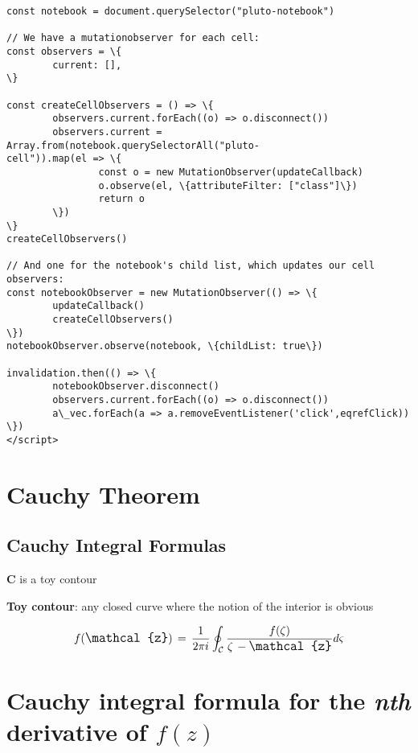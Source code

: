 \documentclass[11pt]{article}
\begin{document}
\begin{tcolorbox}[breakable, size=fbox, boxrule=.5pt, pad at break*=1mm, opacityfill=0]
\begin{Verbatim}[commandchars=\\\{\}]
const notebook = document.querySelector("pluto-notebook")

// We have a mutationobserver for each cell:
const observers = \{
        current: [],
\}

const createCellObservers = () => \{
        observers.current.forEach((o) => o.disconnect())
        observers.current = Array.from(notebook.querySelectorAll("pluto-
cell")).map(el => \{
                const o = new MutationObserver(updateCallback)
                o.observe(el, \{attributeFilter: ["class"]\})
                return o
        \})
\}
createCellObservers()

// And one for the notebook's child list, which updates our cell observers:
const notebookObserver = new MutationObserver(() => \{
        updateCallback()
        createCellObservers()
\})
notebookObserver.observe(notebook, \{childList: true\})

invalidation.then(() => \{
        notebookObserver.disconnect()
        observers.current.forEach((o) => o.disconnect())
        a\_vec.forEach(a => a.removeEventListener('click',eqrefClick))
\})
</script>

\end{Verbatim}
\end{tcolorbox}
        
    \section{Cauchy Theorem}\label{cauchy-theorem}

    \subsection{Cauchy Integral Formulas}\label{cauchy-integral-formulas}

\textbf{C} is a toy contour

\textbf{Toy contour}: any closed curve where the notion of the interior
is obvious

\[\large f(\mathcal{z})\,=\,\frac{1}{2\pi i} \oint_{\mathcal{C}}{\dfrac{f(\zeta)}{\zeta\,-\mathcal{z}}d\varsigma}\]

    \section{\texorpdfstring{Cauchy integral formula for the \emph{nth}
derivative of
\(f(z)\)}{Cauchy integral formula for the nth derivative of f(z)}}\label{cauchy-integral-formula-for-the-nth-derivative-of-fz}
\end{document}
